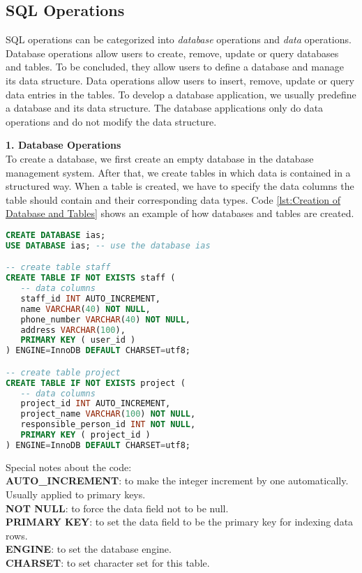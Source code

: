 \subsection{SQL Operations}
SQL operations can be categorized into \textit{database} operations and \textit{data} operations. Database operations allow users to create, remove, update or query databases and tables. To be concluded, they allow users to define a database and manage its data structure. Data operations allow users to insert, remove, update or query data entries in the tables. To develop a database application, we usually predefine a database and its data structure. The database applications only do data operations and do not modify the data structure.  

\textbf{1. Database Operations\\}
To create a database, we first create an empty database in the database management system. After that, we create tables in which data is contained in a structured way. When a table is created, we have to specify the data columns the table should contain and their corresponding data types. Code \ref{lst:Creation of Database and Tables} shows an example of how databases and tables are created.

\begin{lstlisting}[language=SQL, caption={Creation of Database and Tables\label{lst:Creation of Database and Tables}}]
CREATE DATABASE ias;
USE DATABASE ias; -- use the database ias

-- create table staff
CREATE TABLE IF NOT EXISTS staff (
   -- data columns
   staff_id INT AUTO_INCREMENT,
   name VARCHAR(40) NOT NULL,
   phone_number VARCHAR(40) NOT NULL,
   address VARCHAR(100),
   PRIMARY KEY ( user_id )
) ENGINE=InnoDB DEFAULT CHARSET=utf8;

-- create table project
CREATE TABLE IF NOT EXISTS project (
   -- data columns
   project_id INT AUTO_INCREMENT,
   project_name VARCHAR(100) NOT NULL,
   responsible_person_id INT NOT NULL,
   PRIMARY KEY ( project_id )
) ENGINE=InnoDB DEFAULT CHARSET=utf8;
\end{lstlisting}

Special notes about the code: \\
\textbf{AUTO\_INCREMENT}: to make the integer increment by one automatically. Usually applied to primary keys. \\
\textbf{NOT NULL}: to force the data field not to be null. \\
\textbf{PRIMARY KEY}: to set the data field to be the primary key for indexing data rows. \\
\textbf{ENGINE}: to set the database engine. \\
\textbf{CHARSET}: to set character set for this table.

